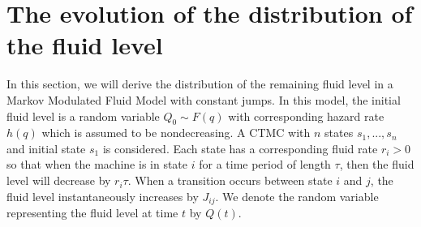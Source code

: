 


\chapter{The evolution of the distribution of the fluid level}
In this section, we will derive the distribution of the remaining fluid level in a Markov Modulated Fluid Model with constant jumps.
In this model, the initial fluid level is a random variable $Q_0\sim F(q)$ with corresponding hazard rate $h(q)$ which is assumed to be nondecreasing.
A CTMC with $n$ states $s_1,...,s_n$ and initial state $s_1$ is considered.
Each state has a corresponding fluid rate $r_i>0$ so that when the machine is in state $i$ for a time period of length $\tau$, then the fluid level will decrease by $r_i\tau$.
When a transition occurs between state $i$ and $j$, the fluid level instantaneously increases by $J_{ij}$.
We denote the random variable representing the fluid level at time $t$ by $Q(t)$.
